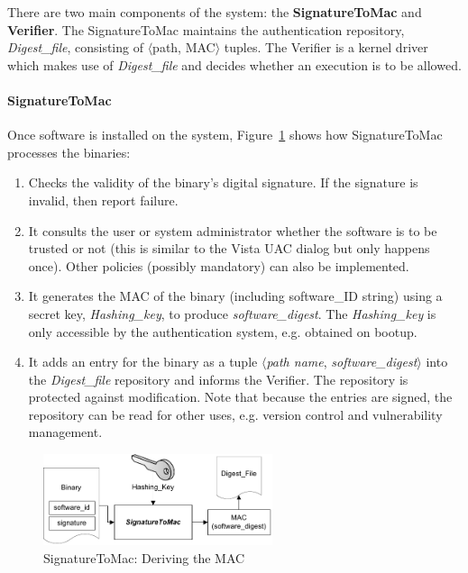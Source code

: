 There are two main components of the system: the {\bf SignatureToMac} and {\bf Verifier}.
The SignatureToMac maintains the authentication repository, {\it Digest\_file}, 
consisting of $\langle$path, MAC$\rangle$ tuples.
The Verifier is a kernel driver which makes use of
{\it Digest\_file} and
decides whether an execution is to be allowed.

\paragraph{SignatureToMac}

Once software is installed on the system,
Figure~\ref{fig:hashing} shows how SignatureToMac processes the binaries:
\begin{enumerate}
\item Checks the validity of the binary's digital signature.
If the signature is invalid, then report failure.
\item It consults the user or system administrator whether 
the software is to be trusted or not (this is similar to the Vista UAC 
dialog but only happens once).
Other policies (possibly mandatory) can also be implemented.
\item It generates the MAC of the binary 
(including software\_ID string) using a secret key, {\it Hashing\_key}, 
to produce {\it software\_digest}.
The {\it Hashing\_key} is only accessible
by the authentication system, e.g. obtained on bootup.
\item It adds an entry for the binary as a tuple $\langle${\it path name}, 
{\it software\_digest}$\rangle$ into the {\it Digest\_file} repository
and informs the Verifier.
The repository is protected against modification. Note that because the entries
are signed, the repository can be read for other uses, e.g.
version control and vulnerability management.
\end{enumerate}

\begin{figure}[tb]
\begin{center}
\includegraphics[width=0.6\textwidth]{binauth/hashing}
\caption{SignatureToMac: Deriving the MAC}
\label{fig:hashing}
\end{center}
\end{figure}

